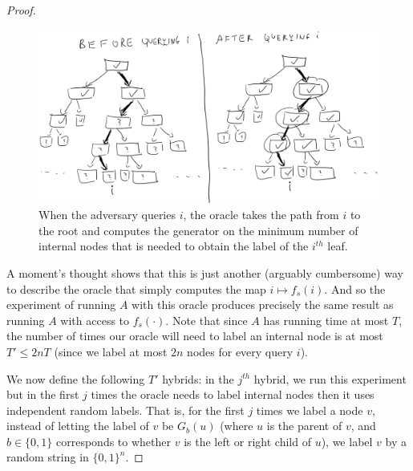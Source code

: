 \begin{proof}
\begin{figure}
\centering
\includegraphics[width=\textwidth, height=0.25\paperheight, keepaspectratio]{../figure/prf-oracle-step.jpg}
\caption{When the adversary queries \(i\), the oracle takes the path
from \(i\) to the root and computes the generator on the minimum number
of internal nodes that is needed to obtain the label of the \(i^{th}\)
leaf.}
\label{oracleevaltreefig}
\end{figure}

A moment's thought shows that this is just another (arguably cumbersome)
way to describe the oracle that simply computes the map
\(i\mapsto f_s(i)\). And so the experiment of running \(A\) with this
oracle produces precisely the same result as running \(A\) with access
to \(f_s(\cdot)\). Note that since \(A\) has running time at most \(T\),
the number of times our oracle will need to label an internal node is at
most \(T' \leq 2nT\) (since we label at most \(2n\) nodes for every
query \(i\)).

We now define the following \(T'\) hybrids: in the \(j^{th}\) hybrid, we
run this experiment but in the first \(j\) times the oracle needs to
label internal nodes then it uses independent random labels. That is,
for the first \(j\) times we label a node \(v\), instead of letting the
label of \(v\) be \(G_b(u)\) (where \(u\) is the parent of \(v\), and
\(b\in \{0,1\}\) corresponds to whether \(v\) is the left or right child
of \(u\)), we label \(v\) by a random string in \(\{0,1\}^n\).


\end{proof}
